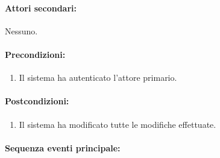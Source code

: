 \documentclass{article}
\begin{document}
	\paragraph{Attori secondari:}Nessuno.
	
	\paragraph{Precondizioni:}
		\begin{enumerate}	[itemsep=8pt,parsep=0pt]
			\item Il sistema ha autenticato l'attore primario.
		\end{enumerate}
	
	\paragraph{Postcondizioni:}
		\begin{enumerate}	[itemsep=8pt,parsep=0pt]
			\item Il sistema ha modificato tutte le modifiche effettuate.
		\end{enumerate}
	
	\paragraph{Sequenza eventi principale:}
\end{document}
